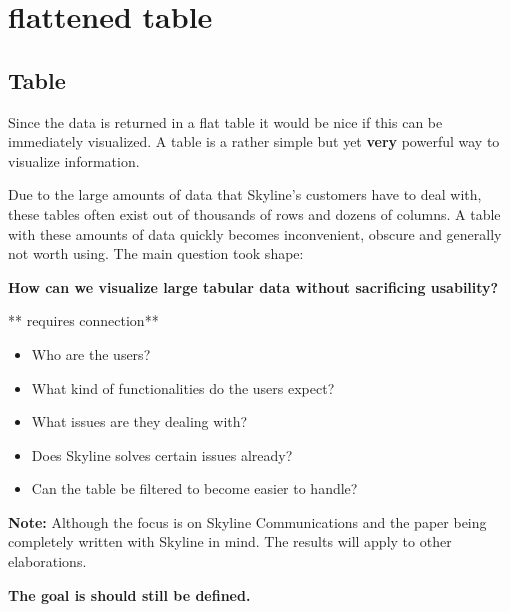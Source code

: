 \section{flattened table}\label{generic-interface-flattened-table}

\subsection{Table}
Since the data is returned in a flat table it would be nice if this can be immediately visualized. A table is a rather simple but yet \textbf{very} powerful way to visualize information.

Due to the large amounts of data that Skyline's customers have to deal with, these tables often exist out of thousands of rows and dozens of columns. A table with these amounts of data quickly becomes inconvenient, obscure and generally not worth using. The main question took shape: 
\begin{center}
\textbf{How can we visualize large tabular data without sacrificing usability?}
\end{center}

** requires connection**
\begin{itemize}
    \item {Who are the users?}
    \item {What kind of functionalities do the users expect?}
    \item {What issues are they dealing with?}
    \item {Does Skyline solves certain issues already?}
    \item {Can the table be filtered to become easier to handle?}
\end{itemize}

\textbf{Note:} Although the focus is on Skyline Communications and the paper being completely written with Skyline in mind. The results will apply to other elaborations.

\textbf{The goal is should still be defined.}
